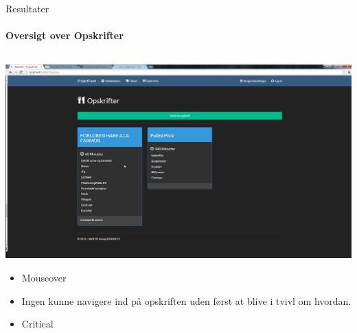 \begin{frame}{Resultater}
\framesubtitle{Oversigt over Opskrifter}

	
	\begin{minipage}[0.3\textheight]{\textwidth}
	\begin{columns}[T]
	\begin{column}{1\textwidth}
	 \includegraphics[width=1\textwidth,height=1\textheight,keepaspectratio, trim={1cm 0 0 16mm}, clip]{images/Screenshots/RecipeOld.png}
	 
	 	\begin{itemize}
	 	\item Mouseover
	 	\item Ingen kunne navigere ind på opskriften uden først at blive i tvivl om hvordan.
	 	\item Critical
	 	
	 	\end{itemize}
	
	\end{column}

	\end{columns}

  \end{minipage}
	
\end{frame}

